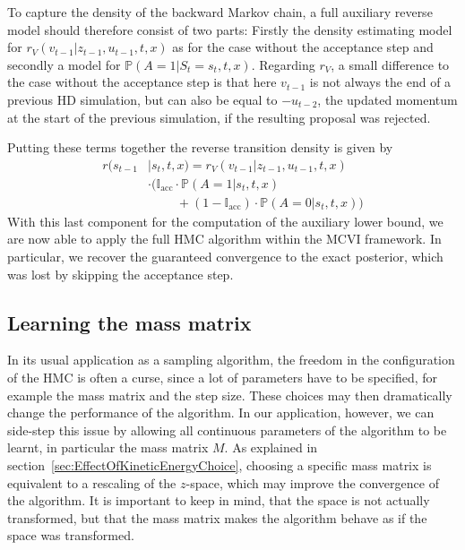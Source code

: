 To capture the density of the backward Markov chain, a full auxiliary reverse model should therefore consist of two parts: Firstly the density estimating model for $r_V(v_{t-1}|z_{t-1}, u_{t-1}, t, x)$ as for the case without the acceptance step and secondly a model for $\mathbb{P}(A = 1|S_t = s_t, t, x)$. Regarding $r_V$, a small difference to the case without the acceptance step is that here $v_{t-1}$ is not always the end of a previous HD simulation, but can also be equal to  $-u_{t-2}$, the updated momentum at the start of the previous simulation, if the resulting proposal was rejected. 

Putting these terms together the reverse transition density is given by
\begin{equation}
\begin{split}
r(s_{t-1} &| s_t, t, x) = r_V(v_{t-1}| z_{t-1}, u_{t-1}, t, x) \\
&\cdot \Big( \mathbb{I}_\textrm{acc} \cdot \mathbb{P}(A = 1 | s_{t}, t, x) \\
&\qquad\; + (1 - \mathbb{I}_\textrm{acc}) \cdot \mathbb{P}(A = 0 | s_{t}, t, x) \Big)
\end{split}
\end{equation}
With this last component for the computation of the auxiliary lower bound, we are now able to apply the full HMC algorithm within the MCVI framework. In particular, we recover the guaranteed convergence to the exact posterior, which was lost by skipping the acceptance step.

\subsection{Learning the mass matrix}
\label{sec:MassMatrixChoice}
In its usual application as a sampling algorithm, the freedom in the configuration of the HMC is often a curse, since a lot of parameters have to be specified, for example the mass matrix and the step size. These choices may then dramatically change the performance of the algorithm. In our application, however, we can side-step this issue by allowing all continuous parameters of the algorithm to be learnt, in particular the mass matrix $M$. As explained in section~\ref{sec:EffectOfKineticEnergyChoice}, choosing a specific mass matrix is equivalent to a rescaling of the $z$-space, which may improve the convergence of the algorithm. It is important to keep in mind, that the space is not actually transformed, but that the mass matrix makes the algorithm behave as if the space was transformed.

